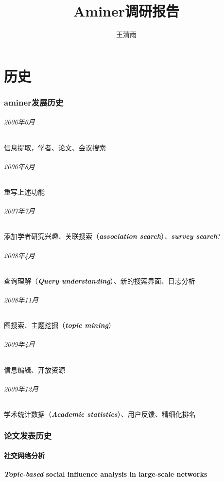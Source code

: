 \documentclass[UTF8]{ctexrep}
\title{Aminer调研报告}
\author{王清雨}
\begin{document}
\maketitle
\newpage
\part{历史}
\section{aminer发展历史}

\paragraph{2006年6月}
信息提取，学者、论文、会议搜索
\paragraph{2006年8月}
重写上述功能
\paragraph{2007年7月}
添加学者研究兴趣、关联搜索（\textbf{\textit{association search}}）、\textbf{\textit{survey search}}?
\paragraph{2008年4月}
查询理解（\textbf{\textit{Query understanding}}）、新的搜索界面、日志分析
\paragraph{2008年11月}
图搜索、主题挖掘（\textbf{\textit{topic mining}}）
\paragraph{2009年4月}
信息编辑、开放资源
\paragraph{2009年12月}
学术统计数据（\textbf{\textit{Academic statistics}}）、用户反馈、精细化排名

\section{论文发表历史}

\subsection{社交网络分析}
\textbf{\textit{Topic-based} social influence analysis in large-scale networks}
\end{document}
